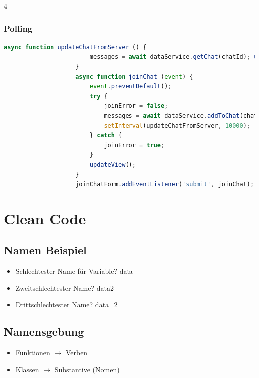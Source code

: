 \documentclass[a4paper, landscape, 8pt]{scrartcl}
\begin{document}
\begin{multicols*}{4}
        \subsubsection{Polling}
        \begin{lstlisting}[language=JavaScript]
                    async function updateChatFromServer () {
                        messages = await dataService.getChat(chatId); updateView();
                    }
                    async function joinChat (event) {
                        event.preventDefault();
                        try {
                            joinError = false;
                            messages = await dataService.addToChat(chatId, `${handle} joined chat`); state = STATE_CHATTING;
                            setInterval(updateChatFromServer, 10000);
                        } catch {
                            joinError = true;
                        }
                        updateView();
                    }
                    joinChatForm.addEventListener('submit', joinChat);
        \end{lstlisting}

        \section{Clean Code}
        \subsection{Namen Beispiel}
        \begin{itemize}
            \item Schlechtester Name für Variable?
            \subitem \textcolor{subsectioncolor}{data}
            \item Zweitschlechtester Name?
            \subitem \textcolor{subsectioncolor}{data2}
            \item Drittschlechtester Name?
            \subitem \textcolor{subsectioncolor}{data\_2}
        \end{itemize}

        \subsection{Namensgebung}
        \begin{itemize}
            \item Funktionen $\to$ Verben
            \item Klassen $\to$ Substantive (Nomen)
        \end{itemize}


\end{multicols*}
\end{document}
